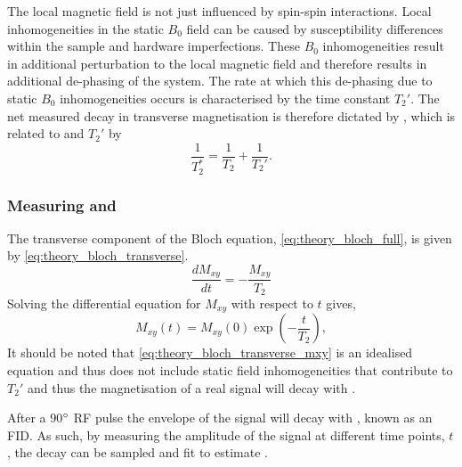The local magnetic field is not just influenced by spin-spin interactions. Local inhomogeneities in the static $B_0$ field can be caused by susceptibility differences within the sample and hardware imperfections. These $B_0$  inhomogeneities result in additional perturbation to the local magnetic field and therefore results in additional de-phasing of the system. The rate at which this de-phasing due to static $B_0$ inhomogeneities occurs is characterised by the time constant $T_2'$. The net measured decay in transverse magnetisation is therefore dictated by \ttwostar, which is related to \ttwo and $T_2'$ by
\begin{equation}
\frac{1}{T_2^*} = \frac{1}{T_2} + \frac{1}{T_2'}.
\end{equation}
\subsubsection{Measuring \ttwo and \ttwostar}
The transverse component of the Bloch equation, \eqref{eq:theory_bloch_full}, is given by \eqref{eq:theory_bloch_transverse}.
\begin{equation}
\frac{dM_{xy}}{dt} = - \frac{M_{xy}}{T_2}
\label{eq:theory_bloch_transverse}
\end{equation}
Solving the differential equation for $M_{xy}$ with respect to $t$ gives,
\begin{equation}
M_{xy}\left(t\right) = M_{xy}\left(0\right)\exp\left(-\frac{t}{T_2}\right),
\label{eq:theory_bloch_transverse_mxy}
\end{equation}
It should be noted that \eqref{eq:theory_bloch_transverse_mxy} is an idealised equation and thus does not include static field inhomogeneities that contribute to $T_2'$ and thus the magnetisation of a real signal will decay with \ttwostar.

After a 90$\degree$ \ac{RF} pulse the envelope of the signal will decay with \ttwostar, known as an \ac{FID}. As such, by measuring the amplitude of the signal at different time points, $t$, the decay can be sampled and fit to estimate \ttwostar.

